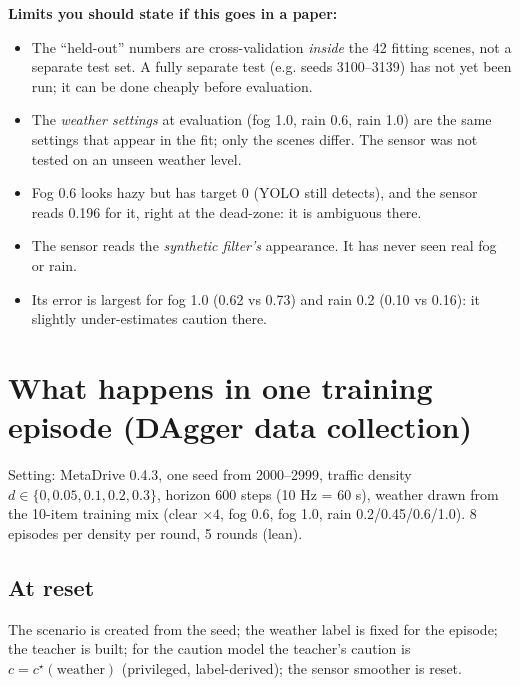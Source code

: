 \documentclass[11pt,a4paper]{article}
\begin{document}
\textbf{Limits you should state if this goes in a paper:}
\begin{itemize}
\item The ``held-out'' numbers are cross-validation \emph{inside} the 42 fitting scenes, not a separate test set. A fully separate test (e.g. seeds 3100--3139) has not yet been run; it can be done cheaply before evaluation.
\item The \emph{weather settings} at evaluation (fog 1.0, rain 0.6, rain 1.0) are the same settings that appear in the fit; only the scenes differ. The sensor was not tested on an unseen weather level.
\item Fog 0.6 looks hazy but has target 0 (YOLO still detects), and the sensor reads 0.196 for it, right at the dead-zone: it is ambiguous there.
\item The sensor reads the \emph{synthetic filter's} appearance. It has never seen real fog or rain.
\item Its error is largest for fog 1.0 (0.62 vs 0.73) and rain 0.2 (0.10 vs 0.16): it slightly under-estimates caution there.
\end{itemize}

\section{What happens in one training episode (DAgger data collection)}
Setting: MetaDrive 0.4.3, one seed from 2000--2999, traffic density $d\in\{0,0.05,0.1,0.2,0.3\}$, horizon 600 steps (10 Hz = 60 s), weather drawn from the 10-item training mix (clear $\times4$, fog 0.6, fog 1.0, rain 0.2/0.45/0.6/1.0). 8 episodes per density per round, 5 rounds (lean).

\subsection{At reset}
The scenario is created from the seed; the weather label is fixed for the episode; the teacher is built; for the caution model the teacher's caution is $c=c^{\star}(\text{weather})$ (privileged, label-derived); the sensor smoother is reset.
\end{document}
